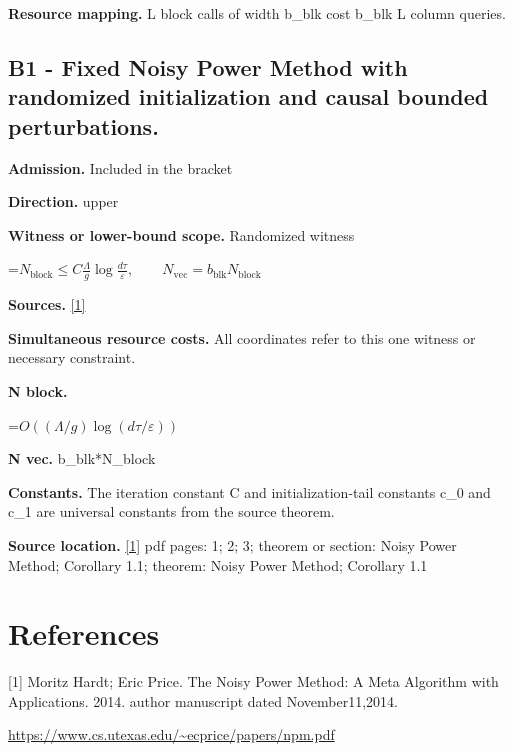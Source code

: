 \documentclass[10pt,a4paper]{article}
\newcommand{\AtlasMath}[1]{\par\begingroup\centering\setbox0=\hbox{$\displaystyle #1$}\ifdim\wd0>1.4\linewidth\typeout{ATLAS WIDE FORMULA: \the\wd0}\fi\ifdim\wd0>\linewidth\resizebox{\linewidth}{!}{\box0}\else\box0\fi\par\endgroup}
\begin{document}
\textbf{Resource mapping.} L block calls of width b\_blk cost b\_blk L column queries.

\subsection{B1 - Fixed Noisy Power Method with randomized initialization and causal bounded perturbations.}
\textbf{Admission.} Included in the bracket

\textbf{Direction.} upper

\textbf{Witness or lower-bound scope.} Randomized witness

\AtlasMath{N_{\mathrm{block}}\le C\frac{\Lambda}{g}\log\frac{d\tau}{\varepsilon},\qquad N_{\mathrm{vec}}=b_{\mathrm{blk}}N_{\mathrm{block}}}
\textbf{Sources.} \href{https://www.cs.utexas.edu/~ecprice/papers/npm.pdf}{[1]}

\textbf{Simultaneous resource costs.} All coordinates refer to this one witness or necessary constraint.

\textbf{N block.}

\AtlasMath{O((\Lambda/g)\log(d\tau/\varepsilon))}
\textbf{N vec.} b\_blk*N\_block

\textbf{Constants.} The iteration constant C and initialization-tail constants c\_0 and c\_1 are universal constants from the source theorem.

\textbf{Source location.} \href{https://www.cs.utexas.edu/~ecprice/papers/npm.pdf}{[1]} pdf pages: 1; 2; 3; theorem or section: Noisy Power Method; Corollary 1.1; theorem: Noisy Power Method; Corollary 1.1

\section{References}
[1] Moritz Hardt; Eric Price. The Noisy Power Method: A Meta Algorithm with Applications. 2014. author manuscript dated November11,2014.

\url{https://www.cs.utexas.edu/~ecprice/papers/npm.pdf}
\end{document}
